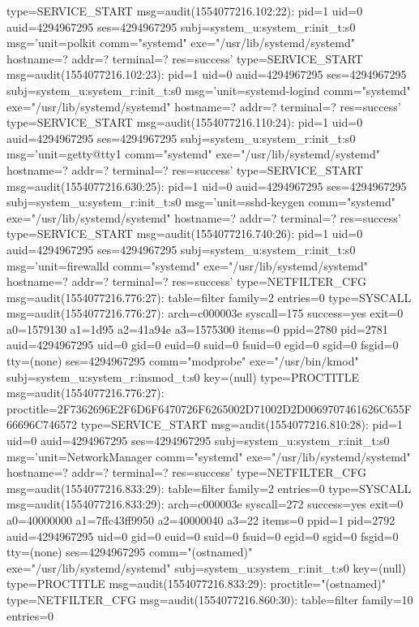 \documentclass[]{report}
\newenvironment{Shaded}{}{}
\newcommand{\NormalTok}[1]{#1}
\begin{document}
\begin{Shaded}
\begin{Highlighting}[]
\NormalTok{type=SERVICE_START msg=audit(1554077216.102:22): pid=1 uid=0 auid=4294967295 ses=4294967295 subj=system_u:system_r:init_t:s0 msg='unit=polkit comm="systemd" exe="/usr/lib/systemd/systemd" hostname=? addr=? terminal=? res=success'}
\NormalTok{type=SERVICE_START msg=audit(1554077216.102:23): pid=1 uid=0 auid=4294967295 ses=4294967295 subj=system_u:system_r:init_t:s0 msg='unit=systemd-logind comm="systemd" exe="/usr/lib/systemd/systemd" hostname=? addr=? terminal=? res=success'}
\NormalTok{type=SERVICE_START msg=audit(1554077216.110:24): pid=1 uid=0 auid=4294967295 ses=4294967295 subj=system_u:system_r:init_t:s0 msg='unit=getty@tty1 comm="systemd" exe="/usr/lib/systemd/systemd" hostname=? addr=? terminal=? res=success'}
\NormalTok{type=SERVICE_START msg=audit(1554077216.630:25): pid=1 uid=0 auid=4294967295 ses=4294967295 subj=system_u:system_r:init_t:s0 msg='unit=sshd-keygen comm="systemd" exe="/usr/lib/systemd/systemd" hostname=? addr=? terminal=? res=success'}
\NormalTok{type=SERVICE_START msg=audit(1554077216.740:26): pid=1 uid=0 auid=4294967295 ses=4294967295 subj=system_u:system_r:init_t:s0 msg='unit=firewalld comm="systemd" exe="/usr/lib/systemd/systemd" hostname=? addr=? terminal=? res=success'}
\NormalTok{type=NETFILTER_CFG msg=audit(1554077216.776:27): table=filter family=2 entries=0}
\NormalTok{type=SYSCALL msg=audit(1554077216.776:27): arch=c000003e syscall=175 success=yes exit=0 a0=1579130 a1=1d95 a2=41a94e a3=1575300 items=0 ppid=2780 pid=2781 auid=4294967295 uid=0 gid=0 euid=0 suid=0 fsuid=0 egid=0 sgid=0 fsgid=0 tty=(none) ses=4294967295 comm="modprobe" exe="/usr/bin/kmod" subj=system_u:system_r:insmod_t:s0 key=(null)}
\NormalTok{type=PROCTITLE msg=audit(1554077216.776:27): proctitle=2F7362696E2F6D6F6470726F6265002D71002D2D0069707461626C655F66696C746572}
\NormalTok{type=SERVICE_START msg=audit(1554077216.810:28): pid=1 uid=0 auid=4294967295 ses=4294967295 subj=system_u:system_r:init_t:s0 msg='unit=NetworkManager comm="systemd" exe="/usr/lib/systemd/systemd" hostname=? addr=? terminal=? res=success'}
\NormalTok{type=NETFILTER_CFG msg=audit(1554077216.833:29): table=filter family=2 entries=0}
\NormalTok{type=SYSCALL msg=audit(1554077216.833:29): arch=c000003e syscall=272 success=yes exit=0 a0=40000000 a1=7ffc43ff9950 a2=40000040 a3=22 items=0 ppid=1 pid=2792 auid=4294967295 uid=0 gid=0 euid=0 suid=0 fsuid=0 egid=0 sgid=0 fsgid=0 tty=(none) ses=4294967295 comm="(ostnamed)" exe="/usr/lib/systemd/systemd" subj=system_u:system_r:init_t:s0 key=(null)}
\NormalTok{type=PROCTITLE msg=audit(1554077216.833:29): proctitle="(ostnamed)"}
\NormalTok{type=NETFILTER_CFG msg=audit(1554077216.860:30): table=filter family=10 entries=0}

\end{Highlighting}
\end{Shaded}
\end{document}
